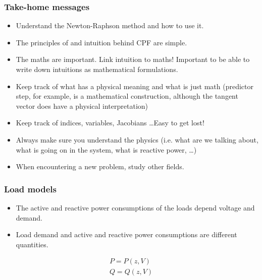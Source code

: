 \documentclass{beamer}
\begin{document}
\begin{frame}
  \frametitle{Take-home messages}
  \begin{itemize}
  \item Understand the Newton-Raphson method and how to use it.
  \item The principles of and intuition behind CPF are simple.
  \item The maths are important. Link intuition to maths! Important to be able to write down intuitions as mathematical formulations.
  \item Keep track of what has a physical meaning and what is just math (predictor step, for example, is a mathematical construction, although the tangent vector does have a physical interpretation)
  \item Keep track of indices, variables, Jacobians \ldots Easy to get lost!
  \item Always make sure you understand the physics (i.e. what are we talking about, what is going on in the system, what is reactive power, \ldots)
  \item When encountering a new problem, study other fields.
  \end{itemize}
\end{frame}

\begin{frame}
  \frametitle{Load models}
  \begin{itemize}
  \item The active and reactive power consumptions of the loads depend voltage and demand.
  \item Load demand and active and reactive power consumptions are different quantities.
  \end{itemize}
  \begin{align*}
    P = P(z,V)\\
    Q = Q(z,V)
  \end{align*}
\end{frame}
\end{document}
